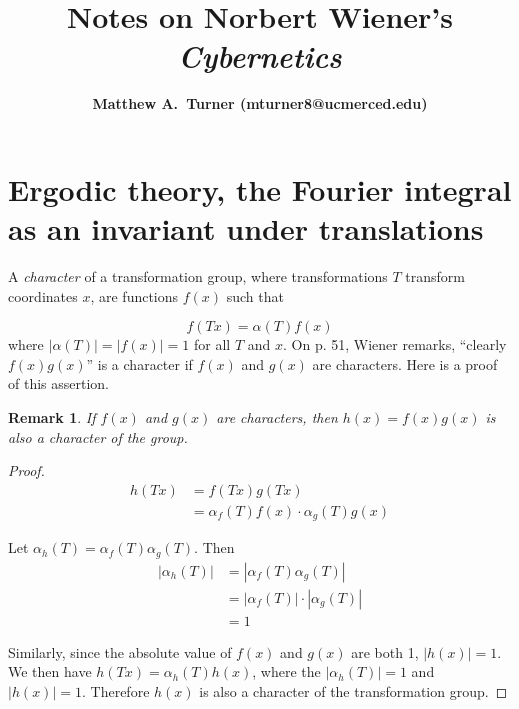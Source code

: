 \documentclass[11pt,letterpaper]{article}
\title{Notes on Norbert Wiener's \emph{Cybernetics}}
\author{{\large \bf Matthew A.~Turner (mturner8@ucmerced.edu)}}
\newtheorem*{remark}{Remark}
\begin{document}
\maketitle

\section{Ergodic theory, the Fourier integral as an invariant under translations}
\label{sec:label}

A \emph{character} of a transformation group, where transformations $T$ transform
coordinates $x$, are functions $f(x)$ such that 

\begin{equation*}
  f(Tx) = \alpha(T) f(x)
\end{equation*}
\noindent
where \(|\alpha(T)| = |f(x)| = 1\) for all $T$ and $x$. On p. 51, Wiener remarks,
``clearly $f(x)g(x)$'' is a character if $f(x)$ and $g(x)$ are characters.
Here is a proof of this assertion.

\begin{remark}
    If $f(x)$ and $g(x)$ are characters, then $h(x) = f(x)g(x)$ is 
    also a character of the group.
\end{remark}
\begin{proof}
    \begin{align*}
        h(Tx) &= f(Tx)g(Tx) \\
              &= \alpha_f(T)f(x) \cdot \alpha_g(T)g(x)
    \end{align*}

    Let \(\alpha_h(T) = \alpha_f(T)\alpha_g(T)\). Then 
    \begin{align*}
        |\alpha_h(T)| &= |\alpha_f(T)\alpha_g(T)| \\
                      &= |\alpha_f(T)| \cdot |\alpha_g(T)| \\
                      &= 1
    \end{align*}

    Similarly, since the absolute value of $f(x)$ and $g(x)$ are both 1, 
    \(|h(x)| = 1\). We then have $h(Tx) = \alpha_h(T)h(x)$, where the
    $|\alpha_h(T)| = 1$ and $|h(x)| = 1$. Therefore $h(x)$ is also a character of
    the transformation group.
\end{proof}

\nocite{Wiener1961}



\setlength{\bibleftmargin}{.125in}
\setlength{\bibindent}{-\bibleftmargin}

\end{document}
